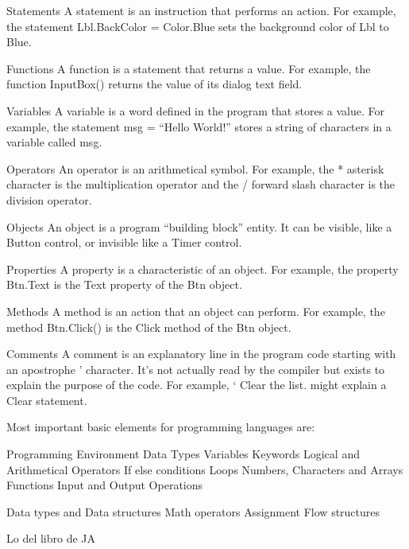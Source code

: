 Statements
A statement is an instruction that performs an action. For example, the statement Lbl.BackColor = Color.Blue sets the background color of Lbl to Blue.

Functions
A function is a statement that returns a value. For example, the function InputBox() returns the value of its dialog text field.

Variables
A variable is a word defined in the program that stores a value. For example, the statement msg = “Hello World!” stores a string of characters in a variable called msg.

Operators
An operator is an arithmetical symbol. For example, the * asterisk character is the multiplication operator and the / forward slash character is the division operator.

Objects
An object is a program “building block” entity. It can be visible, like a Button control, or invisible like a Timer control.

Properties
A property is a characteristic of an object. For example, the property Btn.Text is the Text property of the Btn object.

Methods
A method is an action that an object can perform. For example, the method Btn.Click() is the Click method of the Btn object.

Comments
A comment is an explanatory line in the program code starting with an apostrophe ’ character. It’s not actually read by the compiler but exists to explain the purpose of the code. For example, ‘ Clear the list. might explain a Clear statement.


Most important basic elements for programming languages are:

Programming Environment
Data Types
Variables
Keywords
Logical and Arithmetical Operators
If else conditions
Loops
Numbers, Characters and Arrays
Functions
Input and Output Operations


Data types and Data structures
Math operators
Assignment
Flow structures


Lo del libro de JA



